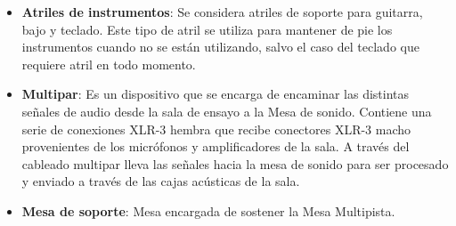 \begin{itemize}
	\item \textbf{Atriles de instrumentos}: Se considera atriles de soporte
	      para guitarra, bajo y teclado. Este tipo de atril se utiliza
	      para mantener de pie los instrumentos cuando no se están
	      utilizando, salvo el caso del teclado que requiere atril
	      en todo momento.
	\item \textbf{Multipar}: Es un dispositivo que se encarga de encaminar 
	      las distintas señales de audio desde la sala de ensayo
	      a la Mesa de sonido. Contiene una serie de conexiones XLR-3
	      hembra que recibe conectores XLR-3 macho provenientes
	      de los micrófonos y amplificadores de la sala. A través
	      del cableado multipar lleva las señales hacia la mesa de
	      sonido para ser procesado y enviado a través de las cajas
	      acústicas de la sala.
	\item \textbf{Mesa de soporte}: Mesa encargada de sostener la Mesa Multipista.
\end{itemize}

